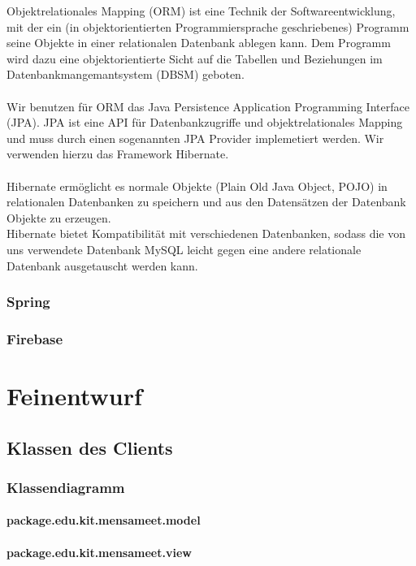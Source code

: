 \documentclass[a4paper]{scrreprt}
\begin{document}
Objektrelationales Mapping (ORM) ist eine Technik der Softwareentwicklung, mit der ein (in objektorientierten Programmiersprache geschriebenes) Programm seine Objekte in einer relationalen Datenbank ablegen kann. Dem Programm wird dazu eine objektorientierte Sicht auf die Tabellen und Beziehungen im Datenbankmangemantsystem (DBSM) geboten. \\  \\ Wir benutzen für ORM das Java Persistence Application Programming Interface (JPA). 
JPA ist eine API für Datenbankzugriffe und objektrelationales Mapping und muss durch einen sogenannten JPA Provider implemetiert werden. Wir verwenden hierzu das Framework Hibernate.\\ \\ Hibernate ermöglicht es normale Objekte (Plain Old Java Object, POJO) in relationalen Datenbanken zu speichern und aus den Datensätzen der Datenbank Objekte zu erzeugen. \\
Hibernate bietet Kompatibilität mit verschiedenen Datenbanken, sodass die von uns verwendete Datenbank MySQL leicht gegen eine andere relationale Datenbank ausgetauscht werden kann.

\subsection*{Spring}
\subsection*{Firebase}

\chapter{Feinentwurf}
\section{Klassen des Clients}
\subsection{Klassendiagramm}
\subsubsection{package.edu.kit.mensameet.model}

\newpage

\subsubsection{package.edu.kit.mensameet.view}
\end{document}

